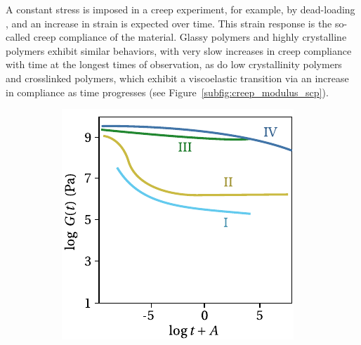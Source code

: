 A constant stress is imposed in a creep experiment, for example, by dead-loading \citep{wildingCreepRecoveryUltra1981}, and an increase in strain is expected over time.
This strain response is the so-called creep compliance of the material.
Glassy polymers and highly crystalline polymers exhibit similar behaviors, with very slow increases in creep compliance with time at the longest times of observation, as do low crystallinity polymers and crosslinked polymers, which exhibit a viscoelastic transition via an increase in compliance as time progresses \citep{ferryViscoelasticPropertiesPolymers1980} (see Figure~\ref{subfig:creep_modulus_scp}).
\begin{figure}[hbtp]
	\centering
	\begin{subfigure}[b]{0.45\textwidth}
							\centering
							\includegraphics[width=\textwidth]{figures/relax_modulus_scp}
							\caption{}
							\label{subfig:relax_modulus_scp}
			\end{subfigure} \hfill
			\begin{subfigure}[b]{0.45\textwidth}
							\centering

\end{subfigure}
\end{figure}
